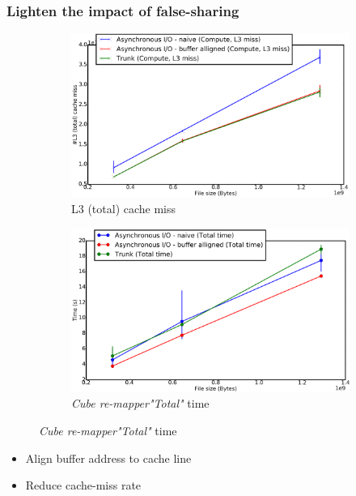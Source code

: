 \documentclass[slidestop,xcolor=dvipsnames, notes=hide]{beamer}
\newcommand{\toolTargetSoftware}			{\emph{Cube re-mapper}}
\begin{document}
		\begin{frame}
			\frametitle{Lighten the impact of false-sharing}
			\begin{figure}[!h]
				\centering
				\begin{subfigure}[b]{0.49\textwidth}
					\centering
					\includegraphics[width=\textwidth]{images/cubeRemapper_falseSharing_compute_trackL3_hpc.png}
					\caption[L3 (total) cache miss]%
					{{\small L3 (total) cache miss}}
				\end{subfigure}
				\hfill
				\begin{subfigure}[b]{0.49\textwidth}
					\centering
					\includegraphics[width=\textwidth]{images/cubeRemapper_falseSharing_overall_time_hpc.png}
					\caption{\small \toolTargetSoftware\space \emph{"Total"} time}
				\end{subfigure}
			\end{figure}

			\begin{block}{}
			\begin{itemize}
				\pause
				\item Align buffer address to cache line
				\pause
				\item Reduce cache-miss rate
			\end{itemize}
			\end{block}
		\end{frame}
\end{document}
